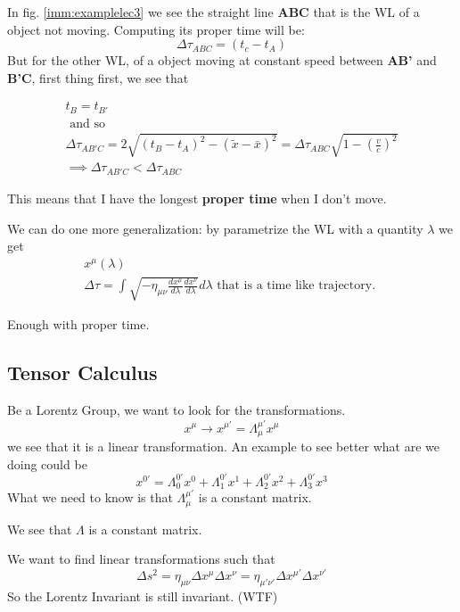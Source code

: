 In fig. \ref{imm:examplelec3} we see the straight line \textbf{ABC} that is the WL of a object not moving. 
Computing its proper time will be:
\begin{equation}
\Delta \tau_{ABC} = \left( t_{c}-t_{A} \right)
\end{equation}
But for the other WL, of a object moving at constant speed between \textbf{AB'} and \textbf{B'C}, first thing first, we see that

\begin{gather*}
t_{B} = t_{B'} \\
\text{ and so } \\
\Delta \tau_{AB'C} = 2 \sqrt{\left( t_{B} - t_{A} \right)^{2} - \left( \tilde{x} - \bar{x} \right)^{2}} = \Delta \tau_{ABC} \sqrt{1 - \left( \frac{v}{c}  \right)^{2}} \\
\implies \Delta \tau_{AB'C} < \Delta \tau_{ABC}
\end{gather*}

This means that I have the longest \textbf{proper time} when I don't move.

We can do one more generalization: by parametrize the WL with a quantity $\lambda $ we get
\begin{gather*}
x^{\mu }\left( \lambda  \right) \\
\Delta \tau = \int \sqrt{- \eta_{\mu \nu } \frac{dx^{\mu }}{d\lambda } \frac{dx^{\nu }}{d\lambda }} d\lambda \text{ that is a time like trajectory. }
\end{gather*}

Enough with proper time.

\subsection{Tensor Calculus}
Be a Lorentz Group, we want to look for the transformations.
\begin{equation}
x^{\mu } \to x^{\mu'} = \Lambda^{\mu'}_{\mu } x^{\mu }
\end{equation}
we see that it is a linear transformation. An example to see better what are we doing could be
\begin{equation}
x^{0'} = \Lambda^{0'}_{0}x^{0} + \Lambda^{0'}_{1}x^{1} + \Lambda^{0'}_{2}x^{2} + \Lambda^{0'}_{3}x^{3}
\end{equation}
What we need to know is that $\Lambda^{\mu'}_{\mu }$ is a constant matrix.

We see that $\Lambda $   is a constant matrix.

We want to find linear transformations such that 
\begin{equation}
\Delta s^{2} = \eta_{\mu \nu } \Delta x^{\mu }\Delta x^{\nu } = \eta_{\mu' \nu'} \Delta x^{\mu'}\Delta x^{\nu'}
\end{equation}
So the Lorentz Invariant is still invariant. (WTF)

